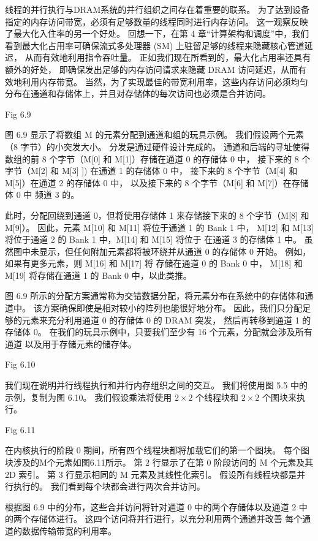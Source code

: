 线程的并行执行与DRAM系统的并行组织之间存在着重要的联系。 
为了达到设备指定的内存访问带宽，必须有足够数量的线程同时进行内存访问。 
这一观察反映了最大化入住率的另一个好处。 
回想一下，在第 4 章“计算架构和调度”中，我们看到最大化占用率可确保流式多处理器 (SM) 上驻留足够的线程来隐藏核心管道延迟，
从而有效地利用指令吞吐量。 正如我们现在所看到的，最大化占用率还具有额外的好处，
即确保发出足够的内存访问请求来隐藏 DRAM 访问延迟，从而有效地利用内存带宽。 
当然，为了实现最佳的带宽利用率，这些内存访问必须均匀分布在通道和存储体上，并且对存储体的每次访问也必须是合并访问。

{\color{red} Fig 6.9}

图 6.9 显示了将数组 M 的元素分配到通道和组的玩具示例。 我们假设两个元素（8 字节）的小突发大小。 
分发是通过硬件设计完成的。 通道和后端的寻址使得数组的前 8 个字节（M[0] 和 M[1]）存储在通道 0 的存储体 0 中，
接下来的 8 个字节（M[2] 和 M[3] ]) 在通道 1 的存储体 0 中，
接下来的 8 个字节（M[4] 和 M[5]）在通道 2 的存储体 0 中，
以及接下来的 8 个字节（M[6] 和 M[7]）在存储体 0 中 频道 3 的。

此时，分配回绕到通道 0，但将使用存储体 1 来存储接下来的 8 个字节（M[8] 和 M[9]）。 
因此，元素 M[10] 和 M[11] 将位于通道 1 的 Bank 1 中，
M[12] 和 M[13] 将位于通道 2 的 Bank 1 中，M[14] 和 M[15] 将位于 在通道 3 的存储体 1 中。
虽然图中未显示，但任何附加元素都将被环绕并从通道 0 的存储体 0 开始。
例如，如果有更多元素，则 M[16] 和 M[17] 将 存储在通道 0 的 Bank 0 中，
M[18] 和 M[19] 将存储在通道 1 的 Bank 0 中，以此类推。

图 6.9 所示的分配方案通常称为交错数据分配，将元素分布在系统中的存储体和通道中。 
该方案确保即使是相对较小的阵列也能很好地分布。 因此，我们只分配足够的元素来充分利用通道 0 的存储体 0 的 DRAM 突发，
然后再转移到通道 1 的存储体 0。
在我们的玩具示例中，只要我们至少有 16 个元素，分配就会涉及所有通道 以及用于存储元素的储存体。

{\color{red} Fig 6.10}

我们现在说明并行线程执行和并行内存组织之间的交互。 我们将使用图 5.5 中的示例，复制为图 6.10。 
我们假设乘法将使用 $2 \times 2$ 个线程块和 $2 \times 2$ 个图块来执行。

{\color{red} Fig 6.11}

在内核执行的阶段 0 期间，所有四个线程块都将加载它们的第一个图块。 每个图块涉及的M个元素如图6.11所示。 
第 2 行显示了在第 0 阶段访问的 M 个元素及其 2D 索引。 第 3 行显示相同的 M 元素及其线性化索引。 
假设所有线程块都是并行执行的。 我们看到每个块都会进行两次合并访问。

根据图 6.9 中的分布，这些合并访问将针对通道 0 中的两个存储体以及通道 2 中的两个存储体进行。
这四个访问将并行进行，以充分利用两个通道并改善 每个通道的数据传输带宽的利用率。

